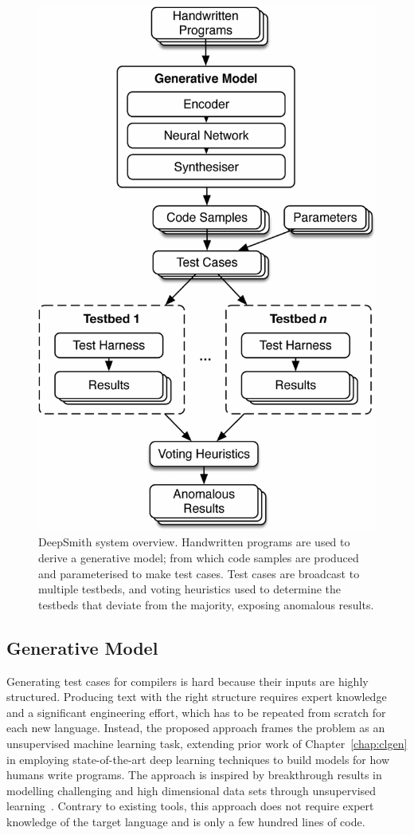 \begin{figure}
  \centering
  \includegraphics[width=.7\columnwidth]{img/deepsmith}
  \caption[DeepSmith system overview]{%
    DeepSmith system overview. Handwritten programs are used to derive a generative model; from which code samples are produced and parameterised to make test cases. Test cases are broadcast to multiple testbeds, and voting heuristics used to determine the testbeds that deviate from the majority, exposing anomalous results.
  }%
  \label{fig:deepsmith}
\end{figure}


\subsection{Generative Model}

Generating test cases for compilers is hard because their inputs are highly structured. Producing text with the right structure requires expert knowledge and a significant engineering effort, which has to be repeated from scratch for each new language. Instead, the proposed approach frames the problem as an unsupervised machine learning task, extending prior work of Chapter~\ref{chap:clgen} in employing state-of-the-art deep learning techniques to build models for how humans write programs. The approach is inspired by breakthrough results in modelling challenging and high dimensional data sets through unsupervised learning~\cite{Raghu2016,Radford2016b,Bowman2015}. Contrary to existing tools, this approach does not require expert knowledge of the target language and is only a few hundred lines of code.


